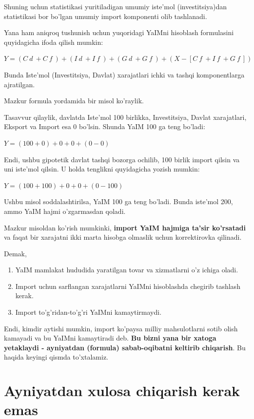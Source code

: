 \documentclass[
  letterpaper,
  DIV=11,
  numbers=noendperiod,
  oneside]{scrreprt}
\providecommand{\tightlist}{%
  \setlength{\itemsep}{0pt}\setlength{\parskip}{0pt}}\usepackage{longtable,booktabs,array}
\begin{document}
Shuning uchun statistikasi yuritiladigan umumiy iste'mol
(investitsiya)dan statistikasi bor bo'lgan umumiy import komponenti olib
tashlanadi.

Yana ham aniqroq tushunish uchun yuqoridagi YaIMni hisoblash formulasini
quyidagicha ifoda qilish mumkin:

\(Y = (C~d~ + C~f~ ) + (I~d~ + I~f~) + (G~d~ + G~f~) +(X- [C~f~ +I~f~ + G~f~])\)

Bunda Iste'mol (Investitsiya, Davlat) xarajatlari ichki va tashqi
komponentlarga ajratilgan.

Mazkur formula yordamida bir misol ko'raylik.

Tasavvur qilaylik, davlatda Iste'mol 100 birlikka, Investitsiya, Davlat
xarajatlari, Eksport va Import esa 0 bo'lsin. Shunda YaIM 100 ga teng
bo'ladi:

\(Y = (100+0) + 0 + 0 + (0-0)\)

Endi, ushbu gipotetik davlat tashqi bozorga ochilib, 100 birlik import
qilsin va uni iste'mol qilsin. U holda tenglikni quyidagicha yozish
mumkin:

\(Y = (100+100) + 0 + 0 + (0-100)\)

Ushbu misol soddalashtirilsa, YaIM 100 ga teng bo'ladi. Bunda iste'mol
200, ammo YaIM hajmi o'zgarmasdan qoladi.

Mazkur misoldan ko'rish mumkinki, \textbf{import YaIM hajmiga ta'sir
ko'rsatadi} va faqat bir xarajatni ikki marta hisobga olmaslik uchun
korrektirovka qilinadi.

Demak,

\begin{enumerate}
\def\labelenumi{\arabic{enumi}.}
\tightlist
\item
  YaIM mamlakat hududida yaratilgan tovar va xizmatlarni o'z ichiga
  oladi.
\item
  Import uchun sarflangan xarajatlarni YaIMni hisoblashda chegirib
  tashlash kerak.
\item
  Import to'g'ridan-to'g'ri YaIMni kamaytirmaydi.
\end{enumerate}

Endi, kimdir aytishi mumkin, import ko'paysa milliy mahsulotlarni sotib
olish kamayadi va bu YaIMni kamaytiradi deb. \textbf{Bu bizni yana bir
xatoga yetaklaydi - ayniyatdan (formula) sabab-oqibatni keltirib
chiqarish}. Bu haqida keyingi qismda to'xtalamiz.


\hypertarget{ayniyatdan-xulosa-chiqarish-kerak-emas}{%
\chapter*{Ayniyatdan xulosa chiqarish kerak
emas}\label{ayniyatdan-xulosa-chiqarish-kerak-emas}}
\end{document}
